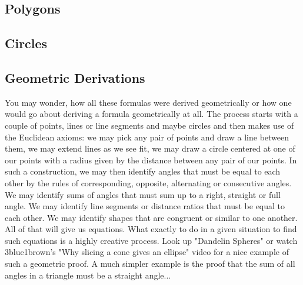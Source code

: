 
\subsection{Polygons}

\subsection{Circles}



\subsection{Geometric Derivations}
You may wonder, how all these formulas were derived geometrically or how one would go about deriving a formula geometrically at all. The process starts with a couple of points, lines or line segments and maybe circles and then makes use of the Euclidean axioms: we may pick any pair of points and draw a line between them, we may extend lines as we see fit, we may draw a circle centered at one of our points with a radius given by the distance between any pair of our points. In such a construction, we may then identify angles that must be equal to each other by the rules of corresponding, opposite, alternating or consecutive angles. We may identify sums of angles that must sum up to a right, straight or full angle. We may identify line segments or distance ratios that must be equal to each other. We may identify shapes that are congruent or similar to one another. All of that will give us equations. What exactly to do in a given situation to find such equations is a highly creative process. Look up "Dandelin Spheres" or watch 3blue1brown's "Why slicing a cone gives an ellipse" video for a nice example of such a geometric proof. A much simpler example is the proof that the sum of all angles in a triangle must be a straight angle...


